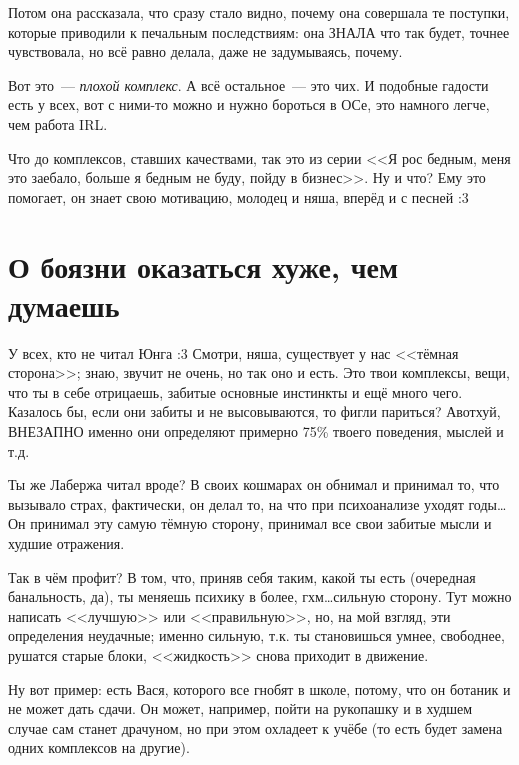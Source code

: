 \documentclass[a5paper,12pt,twoside]{memoir}
\begin{document}
Потом она рассказала, что сразу стало видно, почему она совершала те поступки, которые приводили к печальным последствиям: она ЗНАЛА что так будет, точнее чувствовала, но всё равно делала, даже не задумываясь, почему. 

Вот это~--- \textit{плохой комплекс}. А всё остальное~--- это чих. И подобные гадости есть у всех, вот с ними-то можно и нужно бороться в ОСе, это намного легче, чем работа IRL.

Что до комплексов, ставших качествами, так это из серии <<Я рос бедным, меня это заебало, больше я бедным не буду, пойду в бизнес>>. Ну и что? Ему это помогает, он знает свою мотивацию, молодец и няша, вперёд и с песней :3




\section{О боязни оказаться хуже, чем думаешь}

\medskip
У всех, кто не читал Юнга :3 Смотри, няша, существует у нас <<тёмная сторона>>; знаю, звучит не очень, но так оно и есть. Это твои комплексы, вещи, что ты в себе отрицаешь, забитые основные инстинкты и ещё много чего. Казалось бы, если они забиты и не высовываются, то фигли париться? Авотхуй, ВНЕЗАПНО именно они определяют примерно 75\% твоего поведения, мыслей и т.д.
 
Ты же Лабержа читал вроде? В своих кошмарах он обнимал и принимал то, что вызывало страх, фактически, он делал то, на что при психоанализе уходят годы\ldots Он принимал эту самую тёмную сторону, принимал все свои забитые мысли и худшие отражения.
 
Так в чём профит? В том, что, приняв себя таким, какой ты есть (очередная банальность, да), ты меняешь психику в более, гхм\ldots сильную сторону. Тут можно написать <<лучшую>> или <<правильную>>, но, на мой взгляд, эти определения неудачные; именно сильную, т.к. ты становишься умнее, свободнее, рушатся старые блоки, <<жидкость>> снова приходит в движение. 

Ну вот пример: есть Вася, которого все гнобят в школе, потому, что он ботаник и не может дать сдачи. Он может, например, пойти на рукопашку и в худшем случае сам станет драчуном, но при этом охладеет к учёбе (то есть будет замена одних комплексов на другие).
\end{document}
